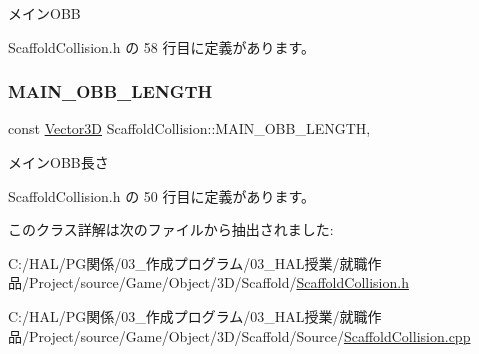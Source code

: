 メイン\+O\+BB 



 Scaffold\+Collision.\+h の 58 行目に定義があります。

\mbox{\label{class_scaffold_collision_a6e805be758e5e2c10b377b102eaa4083}} 
\subsubsection{\texorpdfstring{M\+A\+I\+N\+\_\+\+O\+B\+B\+\_\+\+L\+E\+N\+G\+TH}{MAIN\_OBB\_LENGTH}}
{\footnotesize\ttfamily const \mbox{\hyperlink{class_vector3_d}{Vector3D}} Scaffold\+Collision\+::\+M\+A\+I\+N\+\_\+\+O\+B\+B\+\_\+\+L\+E\+N\+G\+TH\hspace{0.3cm}{\ttfamily [static]}, {\ttfamily [private]}}



メイン\+O\+B\+B長さ 



 Scaffold\+Collision.\+h の 50 行目に定義があります。



このクラス詳解は次のファイルから抽出されました\+:\begin{DoxyCompactItemize}
\item 
C\+:/\+H\+A\+L/\+P\+G関係/03\+\_\+作成プログラム/03\+\_\+\+H\+A\+L授業/就職作品/\+Project/source/\+Game/\+Object/3\+D/\+Scaffold/\mbox{\hyperlink{_scaffold_collision_8h}{Scaffold\+Collision.\+h}}\item 
C\+:/\+H\+A\+L/\+P\+G関係/03\+\_\+作成プログラム/03\+\_\+\+H\+A\+L授業/就職作品/\+Project/source/\+Game/\+Object/3\+D/\+Scaffold/\+Source/\mbox{\hyperlink{_scaffold_collision_8cpp}{Scaffold\+Collision.\+cpp}}\end{DoxyCompactItemize}
